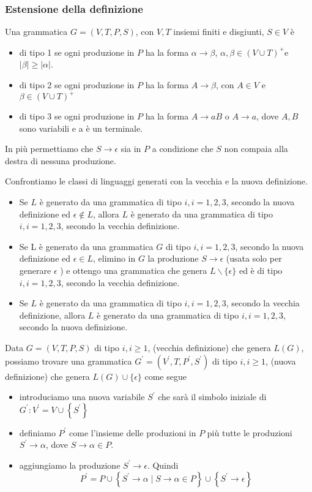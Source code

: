 \subsubsection{Estensione della definizione}
Una grammatica $G=(V, T, P, S)$, con $V, T$ insiemi finiti e disgiunti, $S \in V$ è
\begin{itemize}
    \item di tipo 1 se ogni produzione in $P$ ha la forma $\alpha \rightarrow \beta$, $\alpha, \beta \in(V \cup T)^{+}$e $|\beta| \geq|\alpha|$.
    \item di tipo 2 se ogni produzione in $P$ ha la forma $A \rightarrow \beta$, con $A \in V$ e $\beta \in(V \cup T)^{+}$
    \item di tipo 3 se ogni produzione in $P$ ha la forma $A \rightarrow a B$ o $A \rightarrow a$, dove $A, B$ sono variabili e a è un terminale.
\end{itemize}
In più permettiamo che $S \rightarrow \epsilon$ sia in $P$ a condizione che $S$ non compaia alla destra di nessuna produzione.

Confrontiamo le classi di linguaggi generati con la vecchia e la nuova definizione.
\begin{itemize}
    \item Se $L$ è generato da una grammatica di tipo $i, i=1,2,3$, secondo la nuova definizione ed $\epsilon \notin L$, allora $L$ è generato da una grammatica di tipo $i, i=1,2,3$, secondo la vecchia definizione.
    \item Se L è generato da una grammatica $G$ di tipo $i, i=1,2,3$, secondo la nuova definizione ed $\epsilon \in L$, elimino in $G$ la produzione $S \rightarrow \epsilon$ (usata solo per generare $\epsilon$ ) e ottengo una grammatica che genera $L \backslash\{\epsilon\}$ ed è di tipo $i, i=1,2,3$, secondo la vecchia definizione.
    \item Se $L$ è generato da una grammatica di tipo $i, i=1,2,3$, secondo la vecchia definizione, allora $L$ è generato da una grammatica di tipo $i, i=1,2,3$, secondo la nuova definizione.
\end{itemize}

Data $G=(V, T, P, S)$ di tipo $i, i \geq 1$, (vecchia definizione) che genera $L(G)$, possiamo trovare una grammatica $G^{\prime}=\left(V^{\prime}, T, P^{\prime}, S^{\prime}\right)$ di tipo $i, i \geq 1$, (nuova definizione) che genera $L(G) \cup\{\epsilon\}$ come segue
\begin{itemize}
    \item introduciamo una nuova variabile $S^{\prime}$ che sarà il simbolo iniziale di $G^{\prime}: V^{\prime}=V \cup\left\{S^{\prime}\right\}$
    \item definiamo $P^{\prime}$ come l'insieme delle produzioni in $P$ più tutte le produzioni $S^{\prime} \rightarrow \alpha$, dove $S \rightarrow \alpha \in P$.
    \item aggiungiamo la produzione $S^{\prime} \rightarrow \epsilon$. Quindi
$$
P^{\prime}=P \cup\left\{S^{\prime} \rightarrow \alpha \mid S \rightarrow \alpha \in P\right\} \cup\left\{S^{\prime} \rightarrow \epsilon\right\}
$$
\end{itemize}

